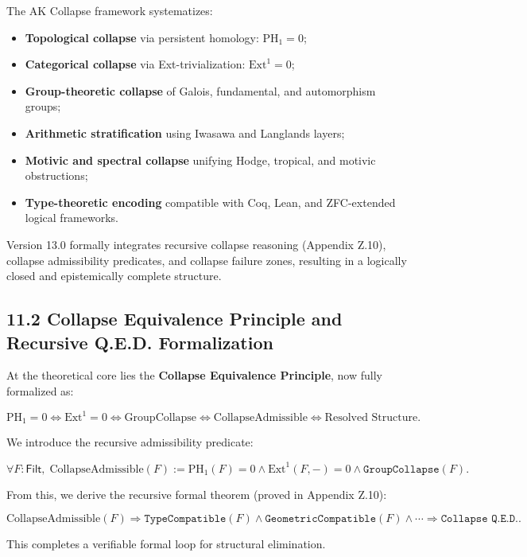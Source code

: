 \documentclass[11pt]{article}
\begin{document}
The AK Collapse framework systematizes:

\begin{itemize}
    \item \textbf{Topological collapse} via persistent homology: \( \mathrm{PH}_1 = 0 \);
    \item \textbf{Categorical collapse} via Ext-trivialization: \( \mathrm{Ext}^1 = 0 \);
    \item \textbf{Group-theoretic collapse} of Galois, fundamental, and automorphism groups;
    \item \textbf{Arithmetic stratification} using Iwasawa and Langlands layers;
    \item \textbf{Motivic and spectral collapse} unifying Hodge, tropical, and motivic obstructions;
    \item \textbf{Type-theoretic encoding} compatible with Coq, Lean, and ZFC-extended logical frameworks.
\end{itemize}

Version 13.0 formally integrates recursive collapse reasoning (Appendix Z.10), collapse admissibility predicates, and collapse failure zones, resulting in a logically closed and epistemically complete structure.

\subsection*{11.2 Collapse Equivalence Principle and Recursive Q.E.D. Formalization}

At the theoretical core lies the \textbf{Collapse Equivalence Principle}, now fully formalized as:

\[
\mathrm{PH}_1 = 0 \iff \mathrm{Ext}^1 = 0 \iff \text{GroupCollapse} \iff \text{CollapseAdmissible} \iff \text{Resolved Structure}.
\]

We introduce the recursive admissibility predicate:

\[
\forall F : \mathsf{Filt},\;
\mathrm{CollapseAdmissible}(F) := \mathrm{PH}_1(F) = 0 \wedge \mathrm{Ext}^1(F, -) = 0 \wedge \texttt{GroupCollapse}(F).
\]

From this, we derive the recursive formal theorem (proved in Appendix Z.10):

\[
\mathrm{CollapseAdmissible}(F) \Rightarrow \texttt{TypeCompatible}(F) \wedge \texttt{GeometricCompatible}(F) \wedge \cdots \Rightarrow \boxed{\texttt{Collapse Q.E.D.}}.
\]

This completes a verifiable formal loop for structural elimination.
\end{document}
